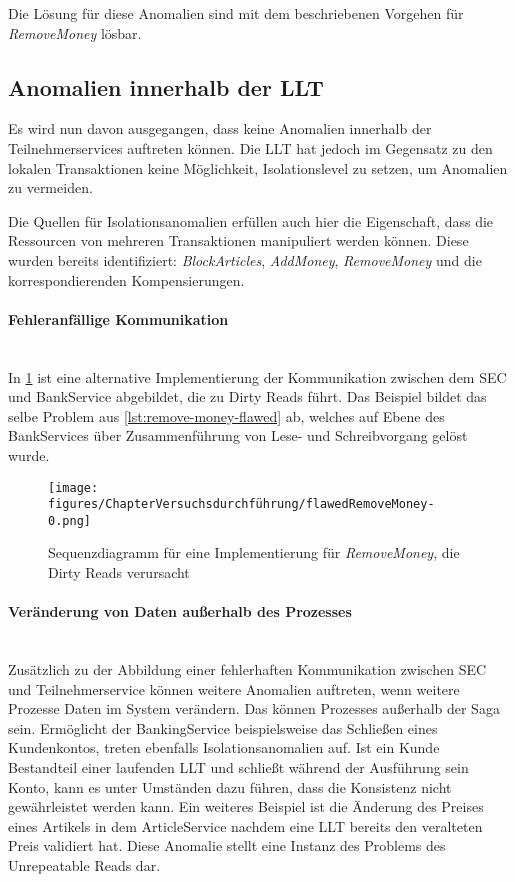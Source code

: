 Die Lösung für diese Anomalien sind mit dem beschriebenen Vorgehen für \textit{RemoveMoney} lösbar.

\subsection{Anomalien innerhalb der LLT}
Es wird nun davon ausgegangen, dass keine Anomalien innerhalb der Teilnehmerservices auftreten können. Die LLT hat jedoch im Gegensatz zu den lokalen Transaktionen keine Möglichkeit, Isolationslevel zu setzen, um Anomalien zu vermeiden. 

Die Quellen für Isolationsanomalien erfüllen auch hier die Eigenschaft, dass die Ressourcen von mehreren Transaktionen manipuliert werden können. Diese wurden bereits identifiziert: \textit{BlockArticles}, \textit{AddMoney}, \textit{RemoveMoney} und die korrespondierenden Kompensierungen.

\paragraph*{Fehleranfällige Kommunikation} \mbox{} \\
In \cref{fig:flawed-RemoveMoney} ist eine alternative Implementierung der Kommunikation zwischen dem SEC und BankService abgebildet, die zu Dirty Reads führt. Das Beispiel bildet das selbe Problem aus \cref{lst:remove-money-flawed} ab, welches auf Ebene des BankServices über Zusammenführung von Lese- und Schreibvorgang gelöst wurde.

\begin{figure}[h!]
	\centering
	\texttt{[image: figures/ChapterVersuchsdurchführung/flawedRemoveMoney-0.png]}
	\caption{Sequenzdiagramm für eine Implementierung für \textit{RemoveMoney}, die Dirty Reads verursacht}
	\label{fig:flawed-RemoveMoney}
\end{figure}
\FloatBarrier

\paragraph*{Veränderung von Daten außerhalb des Prozesses} \mbox{} \\
Zusätzlich zu der Abbildung einer fehlerhaften Kommunikation zwischen SEC und Teilnehmerservice können weitere Anomalien auftreten, wenn weitere Prozesse Daten im System verändern. Das können Prozesses außerhalb der Saga sein. Ermöglicht der BankingService beispielsweise das Schließen eines Kundenkontos, treten ebenfalls Isolationsanomalien auf. Ist ein Kunde Bestandteil einer laufenden LLT und schließt während der Ausführung sein Konto, kann es unter Umständen dazu führen, dass die Konsistenz nicht gewährleistet werden kann. Ein weiteres Beispiel ist die Änderung des Preises eines Artikels in dem ArticleService nachdem eine LLT bereits den veralteten Preis validiert hat. Diese Anomalie stellt eine Instanz des Problems des Unrepeatable Reads dar. 

